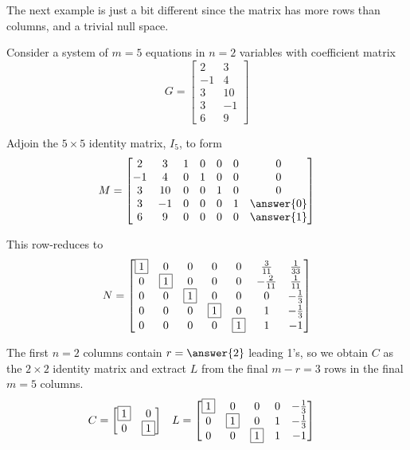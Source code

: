 \documentclass{ximera}
\begin{document}
The next example is just a bit different since the matrix has more
rows than columns, and a trivial null space.

\begin{example}
  Consider a system of $m=5$ equations in $n=2$ variables with coefficient matrix
  \[
    G=
    \begin{bmatrix}
      2 & 3\\
      -1 & 4 \\
      3 & 10\\
      3 &  -1\\
      6 & 9
    \end{bmatrix}
  \]

  Adjoin the $5\times 5$ identity matrix, $I_5$, to form
  \[
    M=
    \begin{bmatrix}
      2 & 3 & 1&0&0&0&0\\
      -1 & 4 & 0&1&0&0&0\\
      3 & 10 & 0&0&1&0&0\\
      3 &  -1 & 0&0&0&1&\answer{0}\\
      6 & 9 & 0&0&0&0&\answer{1}
    \end{bmatrix}
  \]

  This row-reduces to
  \[
    N=
    \begin{bmatrix}
      \fbox{1} & 0 & 0 & 0 & 0 & \frac{3}{11} & \frac{1}{33}\\
      0 & \fbox{1} & 0 & 0 & 0 & -\frac{2}{11} & \frac{1}{11}\\
      0 & 0 & \fbox{1} & 0 & 0 & 0 & -\frac{1}{3}\\
      0 & 0 & 0 & \fbox{1} & 0 & 1 & -\frac{1}{3}\\
      0 & 0 & 0 & 0 & \fbox{1} & 1 & -1
    \end{bmatrix}
  \]

  The first $n=2$ columns contain $r=\answer{2}$ leading 1's, so we
  obtain $C$ as the $2\times 2$ identity matrix and extract $L$ from
  the final $m-r=3$ rows in the final $m=5$ columns.
  \begin{align*}
    C&=
       \begin{bmatrix}
         \fbox{1} & 0\\
         0 & \fbox{1}
       \end{bmatrix}
                     &
                       L&=
                          \begin{bmatrix}
                            \fbox{1} & 0 & 0 & 0 & -\frac{1}{3}\\
                            0 & \fbox{1}  & 0 & 1 & -\frac{1}{3}\\
                            0 & 0 & \fbox{1}  & 1 & -1
                          \end{bmatrix}
  \end{align*}
  

\end{example}
\end{document}
